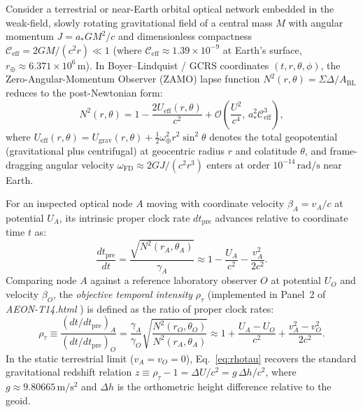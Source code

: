 \documentclass[11pt,a4paper]{article}
\begin{document}
Consider a terrestrial or near-Earth orbital optical network embedded in the weak-field, slowly rotating gravitational field of a central mass $M$ with angular momentum $J = a_* G M^2 / c$ and dimensionless compactness $\mathcal{C}_{\mathrm{eff}} = 2 G M / (c^2 r) \ll 1$ (where $\mathcal{C}_{\mathrm{eff}} \approx 1.39 \times 10^{-9}$ at Earth's surface, $r_\oplus \approx 6.371 \times 10^6\,\mathrm{m}$). In Boyer--Lindquist / GCRS coordinates $(t, r, \theta, \phi)$, the Zero-Angular-Momentum Observer (ZAMO) lapse function $N^2(r,\theta) = \Sigma \Delta / A_{\mathrm{BL}}$ reduces to the post-Newtonian form:
\begin{equation}
N^2(r,\theta) = 1 - \frac{2 U_{\mathrm{eff}}(r,\theta)}{c^2} + \mathcal{O}\!\left(\frac{U^2}{c^4},\, a_*^2 \mathcal{C}_{\mathrm{eff}}^3\right),
\label{eq:zamo_weak}
\end{equation}
where $U_{\mathrm{eff}}(r,\theta) = U_{\mathrm{grav}}(r,\theta) + \frac{1}{2}\omega_\oplus^2 r^2 \sin^2\theta$ denotes the total geopotential (gravitational plus centrifugal) at geocentric radius $r$ and colatitude $\theta$, and frame-dragging angular velocity $\omega_{\mathrm{FD}} \approx 2 G J / (c^2 r^3)$ enters at order $10^{-14}\,\mathrm{rad/s}$ near Earth.

For an inspected optical node $A$ moving with coordinate velocity $\beta_A = v_A / c$ at potential $U_A$, its intrinsic proper clock rate $dt_{\mathrm{pre}}$ advances relative to coordinate time $t$ as:
\begin{equation}
\frac{dt_{\mathrm{pre}}}{dt} = \frac{\sqrt{N^2(r_A,\theta_A)}}{\gamma_A} \approx 1 - \frac{U_A}{c^2} - \frac{v_A^2}{2c^2}.
\label{eq:tpre_rate}
\end{equation}
Comparing node $A$ against a reference laboratory observer $O$ at potential $U_O$ and velocity $\beta_O$, the \emph{objective temporal intensity} $\rho_\tau$ (implemented in Panel~2 of \emph{AEON-T14.html} \cite{damasio2026observatory}) is defined as the ratio of proper clock rates:
\begin{equation}
\rho_\tau \equiv \frac{(dt/dt_{\mathrm{pre}})_A}{(dt/dt_{\mathrm{pre}})_O} = \frac{\gamma_A}{\gamma_O}\sqrt{\frac{N^2(r_O,\theta_O)}{N^2(r_A,\theta_A)}} \approx 1 + \frac{U_A - U_O}{c^2} + \frac{v_A^2 - v_O^2}{2c^2}.
\label{eq:rhotau}
\end{equation}
In the static terrestrial limit ($v_A = v_O = 0$), Eq.~\eqref{eq:rhotau} recovers the standard gravitational redshift relation $z \equiv \rho_\tau - 1 = \Delta U / c^2 = g\,\Delta h / c^2$, where $g \approx 9.80665\,\mathrm{m/s^2}$ and $\Delta h$ is the orthometric height difference relative to the geoid.
\end{document}
